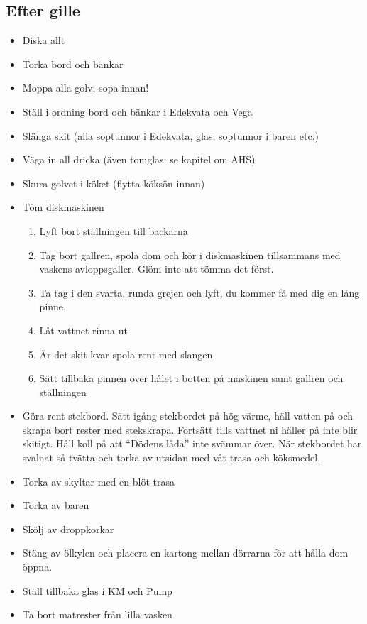 \documentclass[10pt]{article}
\begin{document}
\subsection{Efter gille}
\begin{itemize}
	\item Diska allt
    \item Torka bord och bänkar
    \item Moppa alla golv, sopa innan!
    \item Ställ i ordning bord och bänkar i Edekvata och Vega
    \item Slänga skit (alla soptunnor i Edekvata, glas, soptunnor i baren etc.)
    \item Väga in all dricka (även tomglas: se kapitel om AHS)
    \item Skura golvet i köket (flytta köksön innan)
    \item Töm diskmaskinen
    	\begin{enumerate}
    		\item Lyft bort ställningen till backarna
            \item Tag bort gallren, spola dom och kör i diskmaskinen tillsammans med vaskens avloppsgaller. Glöm inte att tömma det först.
            \item Ta tag i den svarta, runda grejen och lyft, du kommer få med dig en lång pinne.
            \item Låt vattnet rinna ut
            \item Är det skit kvar spola rent med slangen
            \item Sätt tillbaka pinnen över hålet i botten på maskinen samt gallren och ställningen
    	\end{enumerate}
	\item Göra rent stekbord. Sätt igång stekbordet på hög värme, häll vatten på och skrapa bort rester med stekskrapa. Fortsätt tills vattnet ni häller på inte blir skitigt. Håll koll på att ``Dödens låda'' inte svämmar över. När stekbordet har svalnat så tvätta och torka av utsidan med våt trasa och köksmedel.
    \item Torka av skyltar med en blöt trasa
    \item Torka av baren
    \item Skölj av droppkorkar
    \item Stäng av ölkylen och placera en kartong mellan dörrarna för att hålla dom öppna.
    \item Ställ tillbaka glas i KM och Pump
    \item Ta bort matrester från lilla vasken
\end{itemize}
\end{document}
